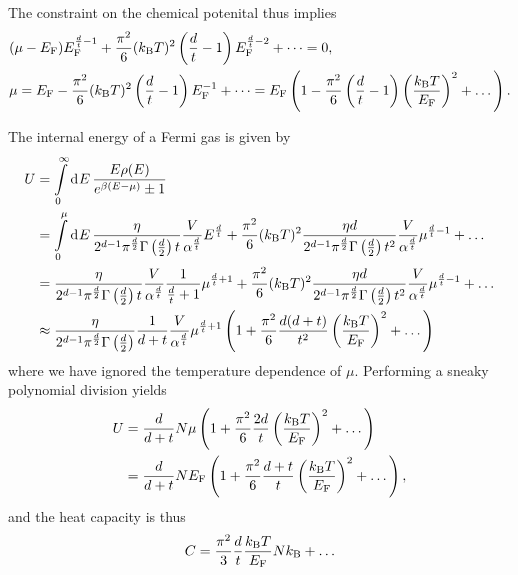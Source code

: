 The constraint on the chemical potenital thus implies
\begin{align*}
	&(\mu - E_{\text{F}})E_{\text{F}}^{\frac{d}{t} - 1} +  \frac{\pi^{2}}{6}(k_{\text{B}} T)^{2}\left(\frac{d}{t} - 1\right)E_{\text{F}}^{\frac{d}{t} - 2} + \dots = 0, \\
	&\mu = E_{\text{F}} - \frac{\pi^{2}}{6}(k_{\text{B}} T)^{2}\left(\frac{d}{t} - 1\right)E_{\text{F}}^{-1} + \dots = E_{\text{F}}\left(1 - \frac{\pi^{2}}{6}\left(\frac{d}{t} - 1\right)\left(\frac{k_{\text{B}} T}{E_{\text{F}}}\right)^{2} + \dots\right).
\end{align*}

The internal energy of a Fermi gas is given by
\begin{align*}
	U &= \int\limits_{0}^{\infty}\dd[]{E}\frac{E\rho(E)}{e^{\beta(E - \mu)} \pm 1} \\
	  &= \int\limits_{0}^{\mu}\dd[]{E}\frac{\eta}{2^{d - 1}\pi^{\frac{d}{2}}\Gamma\left(\frac{d}{2}\right)t}\frac{V}{\alpha^{\frac{d}{t}}}E^{\frac{d}{t}} + \frac{\pi^{2}}{6}(k_{\text{B}} T)^{2}\frac{\eta d}{2^{d - 1}\pi^{\frac{d}{2}}\Gamma\left(\frac{d}{2}\right)t^{2}}\frac{V}{\alpha^{\frac{d}{t}}}\mu^{\frac{d}{t} - 1} + \dots \\
	  &= \frac{\eta}{2^{d - 1}\pi^{\frac{d}{2}}\Gamma\left(\frac{d}{2}\right)t}\frac{V}{\alpha^{\frac{d}{t}}}\frac{1}{\frac{d}{t} + 1}\mu^{\frac{d}{t} + 1} + \frac{\pi^{2}}{6}(k_{\text{B}} T)^{2}\frac{\eta d}{2^{d - 1}\pi^{\frac{d}{2}}\Gamma\left(\frac{d}{2}\right)t^{2}}\frac{V}{\alpha^{\frac{d}{t}}}\mu^{\frac{d}{t} - 1} + \dots \\
	  &\approx \frac{\eta}{2^{d - 1}\pi^{\frac{d}{2}}\Gamma\left(\frac{d}{2}\right)}\frac{1}{d + t}\frac{V}{\alpha^{\frac{d}{t}}}\mu^{\frac{d}{t} + 1}\left(1 + \frac{\pi^{2}}{6}\frac{d(d + t)}{t^{2}}\left(\frac{k_{\text{B}} T}{E_{\text{F}}}\right)^{2} + \dots\right)
\end{align*}
where we have ignored the temperature dependence of $\mu$. Performing a sneaky polynomial division yields
\begin{align*}
	U &= \frac{d}{d + t}N\mu\left(1 + \frac{\pi^{2}}{6}\frac{2d}{t}\left(\frac{k_{\text{B}} T}{E_{\text{F}}}\right)^{2} + \dots\right) \\
	  &= \frac{d}{d + t}NE_{\text{F}}\left(1 + \frac{\pi^{2}}{6}\frac{d + t}{t}\left(\frac{k_{\text{B}} T}{E_{\text{F}}}\right)^{2} + \dots\right),
\end{align*}
and the heat capacity is thus
\begin{align*}
	C = \frac{\pi^{2}}{3}\frac{d}{t}\frac{k_{\text{B}} T}{E_{\text{F}}}Nk_{\text{B}} + \dots
\end{align*}

